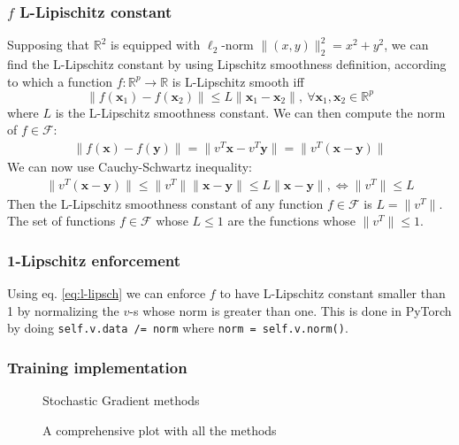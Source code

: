 \documentclass[12pt]{article}
\begin{document}
\subsubsection{$f$ L-Lipischitz constant}
Supposing that $\mathbb{R}^{2}$ is equipped with $\ell_{2}$-norm $\lVert (x, y) \rVert_{2}^{2} = x^{2} + y^{2}$, we can find the L-Lipschitz constant by using Lipschitz smoothness definition, according to which a function $f : \mathbb{R}^p \rightarrow \mathbb{R}$ is L-Lipschitz smooth iff
\begin{equation} \label{def:lipschitz}
    \lVert f(\mathbf{x}_{1}) - f(\mathbf{x}_{2}) \rVert \leq L \lVert \mathbf{x}_{1} - \mathbf{x}_{2} \rVert, 
        \ \forall \mathbf{x}_{1}, \mathbf{x}_{2} \in \mathbb{R}^{p}
\end{equation}
where $L$ is the L-Lipschitz smoothness constant. We can then compute the norm of $f \in \mathcal{F}$:
\begin{gather}
    \lVert f(\mathbf{x}) - f(\mathbf{y}) \rVert = \lVert v^{T} \mathbf{x} - v^{T} \mathbf{y} \rVert = 
        \lVert v^{T} (\mathbf{x} - \mathbf{y}) \rVert
\end{gather}
We can now use Cauchy-Schwartz inequality:
\begin{gather} \label{eq:l-lipsch}
        \lVert v^{T} (\mathbf{x} - \mathbf{y}) \rVert \leq \lVert v^{T} \rVert \lVert \mathbf{x} - \mathbf{y} \rVert \leq L \lVert \mathbf{x} - \mathbf{y} \rVert, \iff \lVert v^{T} \rVert \leq L
\end{gather}
Then the L-Lipschitz smoothness constant of any function $f \in \mathcal{F}$ is $L = \lVert v^{T} \rVert$. The set of functions $f \in \mathcal{F}$ whose $L \leq 1$ are the functions whose $\lVert v^{T} \rVert \leq 1$.

\subsubsection{1-Lipschitz enforcement}

Using eq. \eqref{eq:l-lipsch} we can enforce $f$ to have L-Lipschitz constant smaller than 1 by normalizing the $v$-s whose norm is greater than one. This is done in PyTorch by doing \texttt{self.v.data /= norm} where \texttt{norm = self.v.norm()}.

\subsubsection{Training implementation}

\begin{figure}[!hbt]
\centering
{}
\centering
{}
    \caption{Stochastic Gradient methods}
    \label{fig:gan-alternating}
\endminipage\hfill
{}
\centering
{}
    \caption{A comprehensive plot with all the methods}
    \label{fig:all}
\endminipage\hfill
\end{figure}
\end{document}
